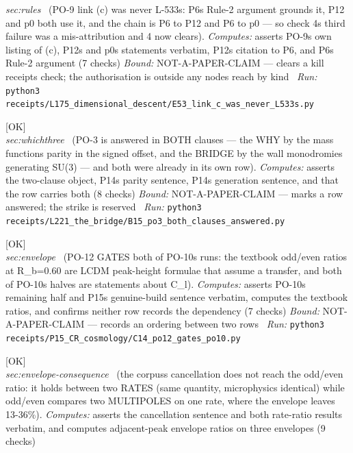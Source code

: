 \begin{description}
\textit{sec:rules} \ (PO-9 link (c) was never L-533s: P6s Rule-2 argument grounds it, P12 and p0 both use it, and the chain is P6 to P12 and P6 to p0 --- so check 4s third failure was a mis-attribution and 4 now clears). 
\emph{Computes:} asserts PO-9s own listing of (c), P12s and p0s statements verbatim, P12s citation to P6, and P6s Rule-2 argument (7 checks)
 \emph{Bound:} NOT-A-PAPER-CLAIM --- clears a kill receipts check; the authorisation is outside any nodes reach by kind
\ \emph{Run:} \texttt{python3 receipts/L175\_dimensional\_descent/E53\_link\_c\_was\_never\_L533s.py}
\item[\label{rcpt:B15_po3_both_clauses_answered}\texttt{B15\_po3\_both\_clauses\_answered}]\hfill\textsf{[OK]}\\
\textit{sec:whichthree} \ (PO-3 is answered in BOTH clauses --- the WHY by the mass functions parity in the signed offset, and the BRIDGE by the wall monodromies generating SU(3) --- and both were already in its own row). 
\emph{Computes:} asserts the two-clause object, P14s parity sentence, P14s generation sentence, and that the row carries both (8 checks)
 \emph{Bound:} NOT-A-PAPER-CLAIM --- marks a row answered; the strike is reserved
\ \emph{Run:} \texttt{python3 receipts/L221\_the\_bridge/B15\_po3\_both\_clauses\_answered.py}
\item[\label{rcpt:C14_po12_gates_po10}\texttt{C14\_po12\_gates\_po10}]\hfill\textsf{[OK]}\\
\textit{sec:envelope} \ (PO-12 GATES both of PO-10s runs: the textbook odd/even ratios at R\_b=0.60 are LCDM peak-height formulae that assume a transfer, and both of PO-10s halves are statements about C\_l). 
\emph{Computes:} asserts PO-10s remaining half and P15s genuine-build sentence verbatim, computes the textbook ratios, and confirms neither row records the dependency (7 checks)
 \emph{Bound:} NOT-A-PAPER-CLAIM --- records an ordering between two rows
\ \emph{Run:} \texttt{python3 receipts/P15\_CR\_cosmology/C14\_po12\_gates\_po10.py}
\item[\label{rcpt:C15_the_cancellation_does_not_reach_the_ratio}\texttt{C15\_the\_cancellation\_does\_not\_reach\_the\_ratio}]\hfill\textsf{[OK]}\\
\textit{sec:envelope-consequence} \ (the corpuss cancellation does not reach the odd/even ratio: it holds between two RATES (same quantity, microphysics identical) while odd/even compares two MULTIPOLES on one rate, where the envelope leaves 13-36\%). 
\emph{Computes:} asserts the cancellation sentence and both rate-ratio results verbatim, and computes adjacent-peak envelope ratios on three envelopes (9 checks)

\end{description}
